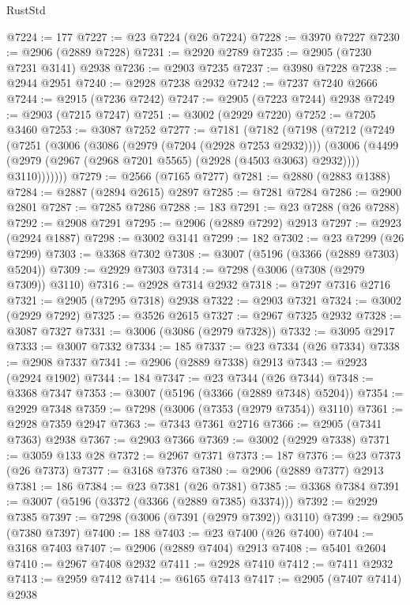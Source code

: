 \begin{lexlean}{RustStd}
\begin{coremodule}
@7224 := 177
@7227 := @23 @7224 (@26 @7224)
@7228 := @3970 @7227
@7230 := @2906 (@2889 @7228)
@7231 := @2920 @2789
@7235 := @2905 (@7230 @7231 @3141) @2938
@7236 := @2903 @7235
@7237 := @3980 @7228
@7238 := @2944 @2951
@7240 := @2928 @7238 @2932
@7242 := @7237 @7240 @2666
@7244 := @2915 (@7236 @7242)
@7247 := @2905 (@7223 @7244) @2938
@7249 := @2903 (@7215 @7247)
@7251 := @3002 (@2929 @7220)
@7252 := @7205 @3460
@7253 := @3087 @7252
@7277 := @7181
    (@7182
      (@7198
        (@7212
          (@7249
            (@7251
              (@3006
                (@3086 (@2979 (@7204 (@2928 @7253 @2932))))
                (@3006
                  (@4499 (@2979 (@2967 (@2968 @7201 @5565) (@2928 (@4503 @3063) @2932))))
                  @3110)))))))
@7279 := @2566 (@7165 @7277)
@7281 := @2880 (@2883 @1388)
@7284 := @2887 (@2894 @2615) @2897
@7285 := @7281 @7284
@7286 := @2900 @2801
@7287 := @7285 @7286
@7288 := 183
@7291 := @23 @7288 (@26 @7288)
@7292 := @2908 @7291
@7295 := @2906 (@2889 @7292) @2913
@7297 := @2923 (@2924 @1887)
@7298 := @3002 @3141
@7299 := 182
@7302 := @23 @7299 (@26 @7299)
@7303 := @3368 @7302
@7308 := @3007 (@5196 (@3366 (@2889 @7303) @5204))
@7309 := @2929 @7303
@7314 := @7298 (@3006 (@7308 (@2979 @7309)) @3110)
@7316 := @2928 @7314 @2932
@7318 := @7297 @7316 @2716
@7321 := @2905 (@7295 @7318) @2938
@7322 := @2903 @7321
@7324 := @3002 (@2929 @7292)
@7325 := @3526 @2615
@7327 := @2967 @7325 @2932
@7328 := @3087 @7327
@7331 := @3006 (@3086 (@2979 @7328))
@7332 := @3095 @2917
@7333 := @3007 @7332
@7334 := 185
@7337 := @23 @7334 (@26 @7334)
@7338 := @2908 @7337
@7341 := @2906 (@2889 @7338) @2913
@7343 := @2923 (@2924 @1902)
@7344 := 184
@7347 := @23 @7344 (@26 @7344)
@7348 := @3368 @7347
@7353 := @3007 (@5196 (@3366 (@2889 @7348) @5204))
@7354 := @2929 @7348
@7359 := @7298 (@3006 (@7353 (@2979 @7354)) @3110)
@7361 := @2928 @7359 @2947
@7363 := @7343 @7361 @2716
@7366 := @2905 (@7341 @7363) @2938
@7367 := @2903 @7366
@7369 := @3002 (@2929 @7338)
@7371 := @3059 @133 @28
@7372 := @2967 @7371
@7373 := 187
@7376 := @23 @7373 (@26 @7373)
@7377 := @3168 @7376
@7380 := @2906 (@2889 @7377) @2913
@7381 := 186
@7384 := @23 @7381 (@26 @7381)
@7385 := @3368 @7384
@7391 := @3007 (@5196 (@3372 (@3366 (@2889 @7385) @3374)))
@7392 := @2929 @7385
@7397 := @7298 (@3006 (@7391 (@2979 @7392)) @3110)
@7399 := @2905 (@7380 @7397)
@7400 := 188
@7403 := @23 @7400 (@26 @7400)
@7404 := @3168 @7403
@7407 := @2906 (@2889 @7404) @2913
@7408 := @5401 @2604
@7410 := @2967 @7408 @2932
@7411 := @2928 @7410
@7412 := @7411 @2932
@7413 := @2959 @7412
@7414 := @6165 @7413
@7417 := @2905 (@7407 @7414) @2938

\end{coremodule}
\end{lexlean}
